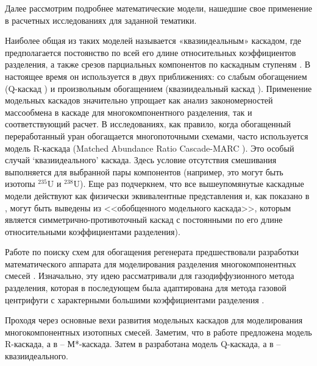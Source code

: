Далее рассмотрим подробнее математические модели, нашедшие свое применение в расчетных исследованиях для заданной тематики.

Наиболее общая из таких моделей называется «квазиидеальным» каскадом, где предполагается постоянство по всей его длине относительных коэффициентов разделения, а также срезов парциальных компонентов по каскадным ступеням \cite{yamamotoMulticomponentIsotopeSeparating1978}.
В настоящее время он используется в двух приближениях: со слабым обогащением (Q-каскад \cite{borisevichNewApproachOptimize2011, kolokoltsovDesignCascadesSeparating1970, zengQCascadeExplanation2012}) и произвольным обогащением (квазиидеальный каскад \cite{sulaberidzeSpecialFeaturesEnrichment2006}).
Применение модельных каскадов значительно упрощает как анализ закономерностей массообмена в каскаде для многокомпонентного разделения, так и соответствующий расчет.
В исследованиях, как правило, когда обогащенный переработанный уран обогащается многопоточными схемами, часто используется модель R-каскада (Matched Abundance Ratio Cascade-MARC \cite{kazukihidaSimultaneousEvaluationEffects1986, delagarzaMulticomponentIsotopeSeparation1961, woodEffectsSeparationProcesses2008}).
Это особый случай `квазиидеального' каскада. Здесь условие отсутствия смешивания выполняется для выбранной пары компонентов (например, это могут быть изотопы $^{235}$U и $^{238}$U).
Еще раз подчеркнем, что все вышеупомянутые каскадные модели действуют как физически эквивалентные представления и, как показано в \cite{sulaberidzeClassificationModelCascades2020}, могут быть выведены из <<обобщенного модельного каскада>>, которым является симметрично-противоточный каскад с постоянными по его длине относительными коэффициентами разделения).

Работе по поиску схем для обогащения регенерата предшествовали разработки математического аппарата для моделирования разделения многокомпонентных смесей \cite{delagarzaMulticomponentIsotopeSeparation1961}.
Изначально, эту идею рассматривали для газодиффузионного метода разделения, которая в последующем была адаптирована для метода газовой центрифуги с характерными большими коэффициентами разделения \cite{yamamotoMulticomponentIsotopeSeparating1978}.

Проходя через основные вехи развития модельных каскадов для моделирования многокомпонентных изотопных смесей. Заметим, что в работе \cite{delagarzaMulticomponentIsotopeSeparation1961} предложена модель R-каскада, а в \cite{levin1963} -- М*-каскада.
Затем в \cite{kolokoltsovDesignCascadesSeparating1970} разработана модель Q-каскада, а в \cite{sazykinKvaziidealnyeKaskadyDlya2000} -- квазиидеального.

